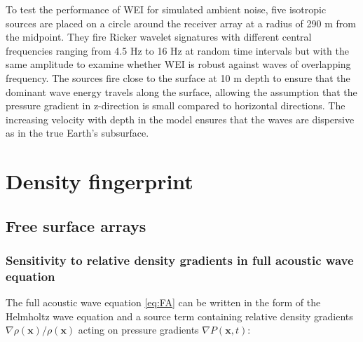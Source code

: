 \documentclass[]{article}
\begin{document}
	To test the performance of WEI for simulated ambient noise, five isotropic sources are placed on a circle around the receiver array at a radius of 290 m from the midpoint. They fire Ricker wavelet signatures with different central frequencies ranging from 4.5 Hz to 16 Hz at random time intervals but with the same amplitude to examine whether WEI is robust against waves of overlapping frequency. The sources fire close to the surface at 10 m depth to ensure that the dominant wave energy travels along the surface, allowing the assumption that the pressure gradient in z-direction is small compared to horizontal directions. The increasing velocity with depth in the model ensures that the waves are dispersive as in the true Earth's subsurface.\\
	
	\section{Density fingerprint} \label{sec:fingerprint}
	\subsection{Free surface arrays}
	\subsubsection*{Sensitivity to relative density gradients in full acoustic wave equation}
	
	The full acoustic wave equation \eqref{eq:FA} can be written in the form of the Helmholtz wave equation and a source term containing relative density gradients $\nabla \rho(\bm{x})/\rho(\bm{x})$ acting on pressure gradients $\nabla P(\bm{x},t)$:
	
\end{document}
